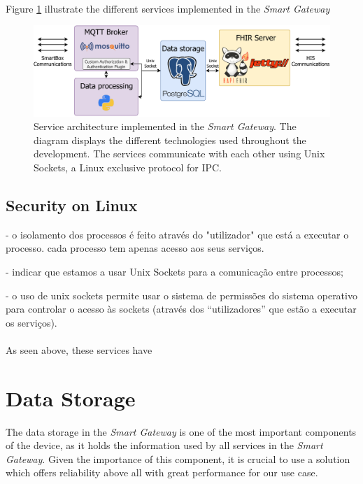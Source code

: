 \paragraph{} Figure \ref{fig:gateway_serviceoverview} illustrate the different services implemented in the \textit{Smart Gateway}

\begin{figure}[H]
    \centering
    \includegraphics[width=\linewidth]{images/service overview gateway.pdf}
    \caption[Service architecture implemented in the \textit{Smart Gateway}.]{Service architecture implemented in the \textit{Smart Gateway}. The diagram displays the different technologies used throughout the development. The services communicate with each other using Unix Sockets, a Linux exclusive protocol for \acf{IPC}.}
    \label{fig:gateway_serviceoverview}
\end{figure}


\subsection{Security on Linux}
- o isolamento dos processos é feito através do "utilizador" que está a executar o processo. cada processo tem apenas acesso aos seus serviços.

- indicar que estamos a usar Unix Sockets para a comunicação entre processos;

- o uso de unix sockets permite usar o sistema de permissões do sistema operativo para controlar o acesso às sockets (através dos ``utilizadores'' que estão a executar os serviços).

\paragraph{} As seen above, these services have 

\section{Data Storage}

The data storage in the \textit{Smart Gateway} is one of the most important components of the device, as it holds the information used by all services in the \textit{Smart Gateway}. Given the importance of this component, it is crucial to use a solution which offers reliability above all with great performance for our use case.  

